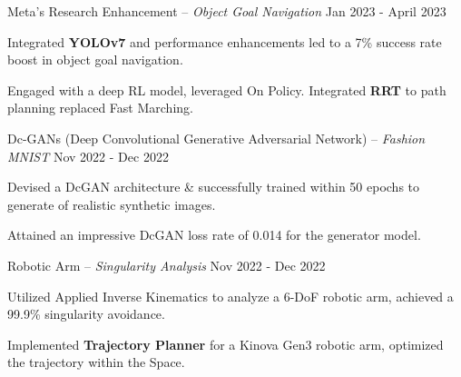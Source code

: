 \begin{cventries}
  \cventry
    {Meta's Research Enhancement -- \textnormal{\textit{Object Goal Navigation}}} %
    {Jan 2023 - April 2023} %
    {
      \begin{cvitems} %
        \item {Integrated {\bf YOLOv7} and performance enhancements led to a 7\% success rate boost in object goal navigation. }
        \item {Engaged with a deep RL model, leveraged On Policy. Integrated {\bf RRT} to path planning replaced Fast Marching.}
      \end{cvitems}
    }
    
  \cventry
    {Dc-GANs \textnormal{(Deep Convolutional Generative Adversarial Network) -- \textit{Fashion MNIST}}} %
    {Nov 2022 - Dec 2022} %
    {
      \begin{cvitems} %
        \item {Devised a DcGAN architecture \& successfully trained within 50 epochs to generate of realistic synthetic images.}
        \item {Attained an impressive DcGAN loss rate of 0.014 for the generator model.}
      \end{cvitems}
    }
    
  \cventry
    {Robotic Arm \textnormal{ -- \textit{Singularity Analysis}}} %
    {Nov 2022 - Dec 2022} %
    {
      \begin{cvitems} %
          \item {Utilized Applied Inverse Kinematics to analyze a 6-DoF robotic arm, achieved a 99.9\% singularity avoidance.}
          \item {Implemented {\bf Trajectory Planner} for a Kinova Gen3 robotic arm, optimized the trajectory within the Space.}
      \end{cvitems}
    }
    


\end{cventries}
